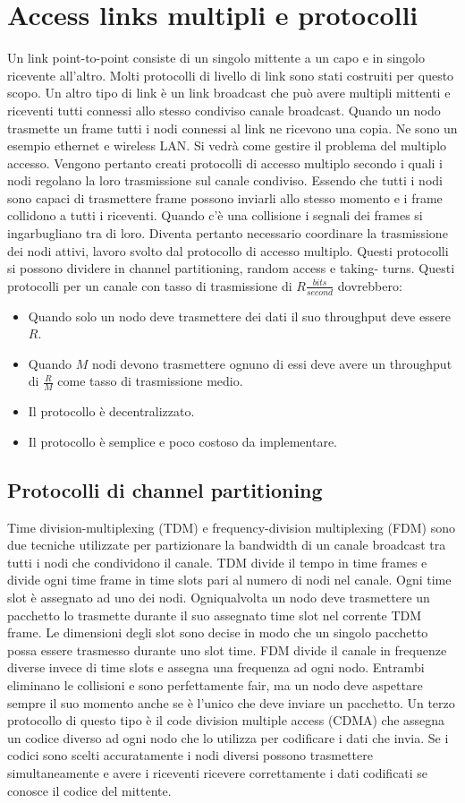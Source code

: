 \section{Access links multipli e protocolli}
Un link point-to-point consiste di un singolo mittente a un capo e in singolo ricevente all'altro. Molti protocolli di livello di link sono stati costruiti per questo scopo. Un altro tipo di link \`e un link broadcast che 
pu\`o avere multipli mittenti e riceventi tutti connessi allo stesso condiviso canale broadcast. Quando un nodo trasmette un frame tutti i nodi connessi al link ne ricevono una copia. Ne sono un esempio 
ethernet e wireless LAN. Si vedr\`a come gestire il problema del multiplo accesso. Vengono pertanto creati protocolli di accesso multiplo secondo i quali i nodi regolano la loro trasmissione sul canale condiviso.
Essendo che tutti i nodi sono capaci di trasmettere frame possono inviarli allo stesso momento e i frame collidono a tutti i riceventi. Quando c'\`e una collisione i segnali dei frames si ingarbugliano tra di loro. 
Diventa pertanto necessario coordinare la trasmissione dei nodi attivi, lavoro svolto dal protocollo di accesso multiplo. Questi protocolli si possono dividere in channel partitioning, random access e taking-
turns. Questi protocolli per un canale con tasso di trasmissione di $R\frac{bits}{second}$ dovrebbero:
\begin{itemize}
\item Quando solo un nodo deve trasmettere dei dati il suo throughput deve essere $R$.
\item Quando $M$ nodi devono trasmettere ognuno di essi deve avere un throughput di $\frac{R}{M}$ come tasso di trasmissione medio.
\item Il protocollo \`e decentralizzato.
\item Il protocollo \`e semplice e poco costoso da implementare.
\end{itemize}
\subsection{Protocolli di channel partitioning}
Time division-multiplexing (TDM) e frequency-division multiplexing (FDM) sono due tecniche utilizzate per partizionare la bandwidth di un canale broadcast tra tutti i nodi che condividono il canale. TDM divide
il tempo in time frames e divide ogni time frame in time slots pari al numero di nodi nel canale. Ogni time slot \`e assegnato ad uno dei nodi. Ogniqualvolta un nodo deve trasmettere un pacchetto lo trasmette
durante il suo assegnato time slot nel corrente TDM frame. Le dimensioni degli slot sono decise in modo che un singolo pacchetto possa essere trasmesso durante uno slot time.   FDM divide il canale in 
frequenze diverse invece di time slots e assegna una frequenza ad ogni nodo. Entrambi eliminano le collisioni e sono perfettamente fair, ma un nodo deve aspettare sempre il suo momento anche se \`e l'unico 
che deve inviare un pacchetto. Un terzo protocollo di questo tipo \`e il code division multiple access (CDMA) che assegna un codice diverso ad ogni nodo che lo utilizza per codificare i dati che invia. Se i codici
sono scelti accuratamente i nodi diversi possono trasmettere simultaneamente e avere i riceventi ricevere correttamente i dati codificati se conosce il codice del mittente. 
